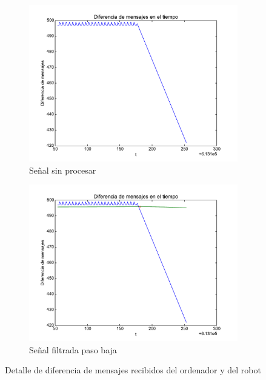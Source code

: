 \begin{figure}[]
	\centering
	\begin{subfigure}[b]{0.45\textwidth}
		\includegraphics[width=\linewidth]{imagenes/resultados/diferenciadetalle.pdf}
		\caption{Señal sin procesar}
		\label{fig:resultados/diferenciadetalle}
	\end{subfigure}
	\begin{subfigure}[b]{0.45\textwidth}
		\includegraphics[width=\linewidth]{imagenes/resultados/diferenciafiltdetalle.pdf}
		\caption{Señal filtrada paso baja}
		\label{fig:resultados/diferenciadetallefilt}
	\end{subfigure}
	\caption{Detalle de diferencia de mensajes recibidos del ordenador y del robot}
\end{figure}

